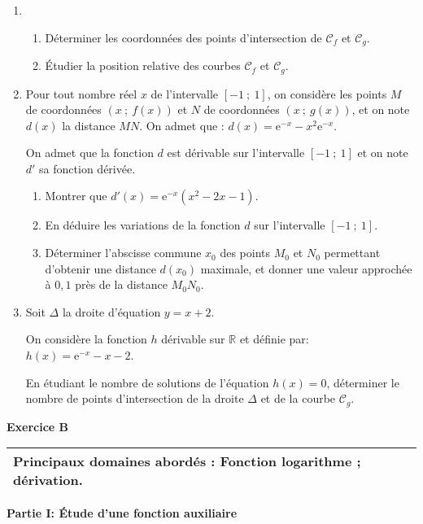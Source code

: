 \documentclass[10pt,a4paper,french]{article}
\newcommand{\R}{\mathbb{R}}
\begin{document}
\begin{enumerate}
\item
	\begin{enumerate}
		\item Déterminer les coordonnées des points d'intersection de $\mathcal{C}_f$ et $\mathcal{C}_g$.
		\item Étudier la position relative des courbes $\mathcal{C}_f$ et $\mathcal{C}_g$.
	\end{enumerate}
\item  Pour tout nombre réel $x$ de l'intervalle $[-1~;~1]$, on considère les points $M$ de coordonnées $(x~;~f(x))$ et $N$ de coordonnées $(x~;~g(x))$, et on note $d(x)$ la distance $MN$. On admet que : $d(x)= \text{e}^{-x} - x^2\text{e}^{-x}$.

On admet que la fonction $d$ est dérivable sur l'intervalle $[-1~;~1]$ et on note $d'$ sa fonction dérivée.
	\begin{enumerate}
		\item Montrer que $d'(x) = \text{e}^{-x}\left(x^2 - 2x - 1\right)$.
		\item En déduire les variations de la fonction $d$ sur l'intervalle $[-1~;~1]$.
		\item Déterminer l'abscisse commune $x_0$ des points $M_0$ et $N_0$ permettant d'obtenir une
distance $d\left(x_0\right)$ maximale, et donner une valeur approchée à $0,1$ près de la distance $M_0N_0$.
	\end{enumerate}
\item  Soit $\Delta$ la droite d'équation $y = x + 2$.

On considère la fonction $h$ dérivable sur $\R$ et définie par: $h(x) = \text{e}^{-x} - x - 2$.

En étudiant le nombre de solutions de l'équation $h(x) = 0$, déterminer le nombre de points d'intersection de la droite $\Delta$ et de la courbe $\mathcal{C}_g$.
\end{enumerate}

\textbf{Exercice B}

\medskip

\begin{tabularx}{\linewidth}{|X|}\hline
\textbf{Principaux domaines abordés :
Fonction logarithme ; dérivation.}\\ \hline
\end{tabularx}

\bigskip

\textbf{Partie I: Étude d'une fonction auxiliaire}

\medskip
\end{document}
